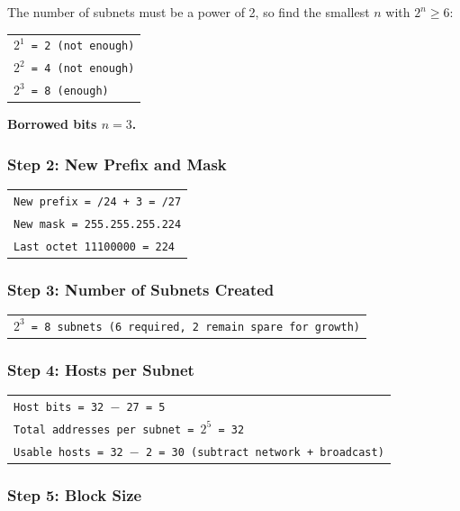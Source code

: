 \documentclass[11pt,a4paper]{article}
\begin{document}
The number of subnets must be a power of 2, so find the smallest $n$ with
$2^{n} \ge 6$:

\begin{tabularx}{\textwidth}{@{}X@{}}
\texttt{$2^{1}$ = 2 (not enough)} \\
\texttt{$2^{2}$ = 4 (not enough)} \\
\texttt{$2^{3}$ = 8 (enough)} \\
\end{tabularx}

\textbf{Borrowed bits $n = 3$.}

\subsubsection*{Step 2: New Prefix and Mask}

\begin{tabularx}{\textwidth}{@{}X@{}}
\texttt{New prefix = /24 + 3 = /27} \\
\texttt{New mask = 255.255.255.224} \\
\texttt{Last octet 11100000 = 224} \\
\end{tabularx}

\subsubsection*{Step 3: Number of Subnets Created}

\begin{tabularx}{\textwidth}{@{}X@{}}
\texttt{$2^{3}$ = 8 subnets (6 required, 2 remain spare for growth)} \\
\end{tabularx}

\subsubsection*{Step 4: Hosts per Subnet}

\begin{tabularx}{\textwidth}{@{}X@{}}
\texttt{Host bits = 32 $-$ 27 = 5} \\
\texttt{Total addresses per subnet = $2^{5}$ = 32} \\
\texttt{Usable hosts = 32 $-$ 2 = 30 (subtract network + broadcast)} \\
\end{tabularx}

\subsubsection*{Step 5: Block Size}
\end{document}

